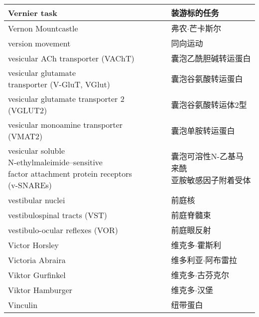 \begin{longtable}{lll}
	\midrule
	Vernier task   && 装游标的任务  \\
	
	\midrule
	Vernon Mountcastle   && 弗农$\cdot$芒卡斯尔  \\
	
	\midrule
	version movement   && 同向运动  \\
	
	\midrule
	vesicular ACh transporter (VAChT)   && 囊泡乙酰胆碱转运蛋白  \\
	
	\midrule
	\makecell[l]{vesicular glutamate \\transporter (V-GluT, VGlut)}   && 囊泡谷氨酸转运蛋白  \\
	
	\midrule
	vesicular glutamate transporter 2 (VGLUT2)   && 囊泡谷氨酸转运体2型  \\
	
	\midrule
	vesicular monoamine transporter (VMAT2)   && 囊泡单胺转运蛋白  \\
	
	\midrule
	\makecell[l]{vesicular soluble \\N-ethylmaleimide–sensitive \\factor attachment protein receptors\\ (v-SNAREs)}  && \makecell[l]{囊泡可溶性N-乙基马来酰\\亚胺敏感因子附着受体}  \\
	
	\midrule
	vestibular nuclei   && 前庭核  \\
	
	\midrule
	vestibulospinal tracts (VST)   && 前庭脊髓束  \\
	
	\midrule
	vestibulo-ocular reflexes (VOR)   && 前庭眼反射  \\
	
	\midrule
	Victor Horsley   && 维克多$\cdot$霍斯利  \\
	
	\midrule
	Victoria Abraira   && 维多利亚$\cdot$阿布雷拉  \\
	
	\midrule
	Viktor Gurfinkel   && 维克多$\cdot$古芬克尔  \\
	
	\midrule
	Viktor Hamburger   && 维克多$\cdot$汉堡  \\
	
	\midrule
	Vinculin   && 纽带蛋白  \\
	

\end{longtable}
